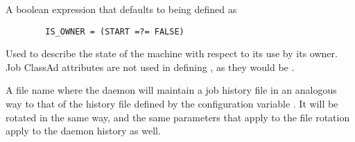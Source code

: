 \begin{description}
\label{param:IsOwner}
\item[\Macro{IS\_OWNER}]
  A boolean expression that defaults to being defined as
\begin{verbatim}
        IS_OWNER = (START =?= FALSE)
\end{verbatim}
  Used to describe the state of the machine with respect to its use
  by its owner.
  Job ClassAd attributes are not used in defining ,
  as they would be .

\label{param:StartdHistory}
\item[\Macro{STARTD\_HISTORY}]
  A file name where the  daemon will
  maintain a job history file in an analogous way to that of the 
  history file defined by the configuration variable .
  It will be rotated in the same way,
  and the same parameters that apply to the  file
  rotation apply to the  daemon history as well.

\end{description}




